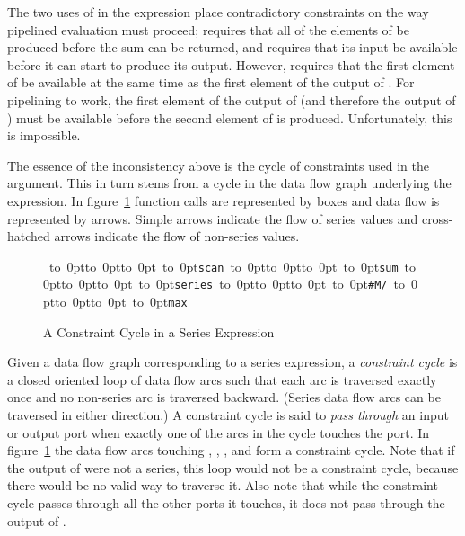 The two uses of  in the expression place contradictory
constraints on the way pipelined evaluation must proceed;  
requires that all of the elements of  be produced before the sum can
be returned, and  requires that its input be available before it
can start to produce its output.  However,  requires that the
first element of  be available at the same time as the first element
of the output of .  For pipelining to work,
the first element of the output of  (and therefore the output
of ) must be available before the second element of 
 is produced.  Unfortunately, this is impossible.

The essence of the inconsistency above is the cycle of constraints used in
the argument.  This in turn stems from a cycle in the data flow graph
underlying the expression.  In
figure~\ref{SERIES-F1-FIGURE} function calls are represented by boxes and data
flow is represented by arrows.  Simple arrows indicate the flow of series
values and cross-hatched arrows indicate the flow of non-series values.

\begin{figure}[t]
\caption{A Constraint Cycle in a Series Expression}\label{SERIES-F1-FIGURE}
\vskip 5pc
\relax
\hbox{\relax
\def\foo#1#2#3{\vbox to 0pt{\vskip #2\vskip 3pt\hbox to 0pt{\hskip #1\hskip -3pt\vbox to 0pt{\vss
   \hbox to 0pt{\hss \tt #3\hss}\vss}\hss}\vss}}
\foo{2.5pc}{-3.5pc}{scan}\relax
\foo{8.5pc}{-2.5pc}{sum}\relax
\foo{14pc}{-2.5pc}{series}\relax
\foo{19.5pc}{-3.5pc}{\#M/}\relax
\foo{25pc}{-3.5pc}{max}}
\end{figure}

Given a data flow graph corresponding to a series expression, a {\it
constraint cycle} is a closed oriented loop of data flow arcs such
that each arc is traversed exactly once and no non-series arc
is traversed backward.  (Series data flow arcs can be traversed in either
direction.)  A constraint cycle is said to \emph{pass through} an input or
output port when exactly one of the arcs in the cycle touches the port.  In
figure~\ref{SERIES-F1-FIGURE} the data flow arcs touching , ,
, and  form a constraint cycle.  Note that if the
output of  were not a series, this loop would not be a constraint
cycle, because there would be no valid way to traverse it.  Also note that
while the constraint cycle passes through all the other ports it touches,
it does not pass through the output of .

